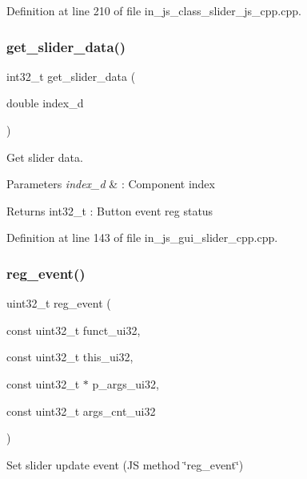 Definition at line 210 of file in\+\_\+js\+\_\+class\+\_\+slider\+\_\+js\+\_\+cpp.\+cpp.

\mbox{\label{group___slider_ga2350d7254e203857bba198b0cdf3936a}} 
\subsubsection{get\_slider\_data()}
{\footnotesize\ttfamily int32\+\_\+t get\+\_\+slider\+\_\+data (\begin{DoxyParamCaption}\item[{double}]{index\+\_\+d }\end{DoxyParamCaption})}



Get slider data. 


\begin{DoxyParams}{Parameters}
{\em index\+\_\+d} & \+: Component index \\
\hline
\end{DoxyParams}
\begin{DoxyReturn}{Returns}
int32\+\_\+t \+: Button event reg status 
\end{DoxyReturn}


Definition at line 143 of file in\+\_\+js\+\_\+gui\+\_\+slider\+\_\+cpp.\+cpp.

\mbox{\label{group___slider_gaec005a4f579a1a6d57a16392e5cdd07e}} 
\subsubsection{reg\_event()}
{\footnotesize\ttfamily uint32\+\_\+t reg\+\_\+event (\begin{DoxyParamCaption}\item[{const uint32\+\_\+t}]{funct\+\_\+ui32,  }\item[{const uint32\+\_\+t}]{this\+\_\+ui32,  }\item[{const uint32\+\_\+t $\ast$}]{p\+\_\+args\+\_\+ui32,  }\item[{const uint32\+\_\+t}]{args\+\_\+cnt\+\_\+ui32 }\end{DoxyParamCaption})\hspace{0.3cm}{\ttfamily [static]}}



Set slider update event (JS method \char`\"{}reg\+\_\+event\char`\"{}) 



